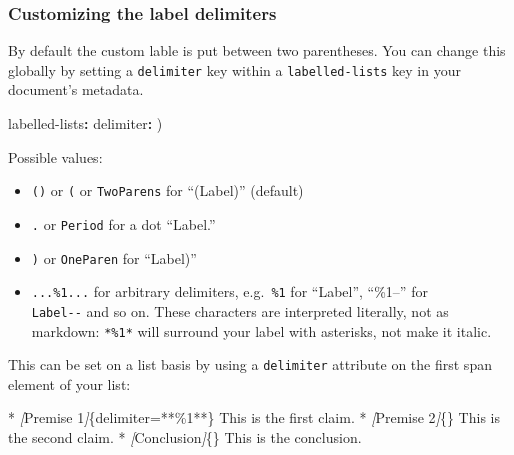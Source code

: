 \documentclass[
]{article}
\newenvironment{Shaded}{}{}
\newcommand{\AttributeTok}[1]{\textcolor[rgb]{0.49,0.56,0.16}{#1}}
\newcommand{\CommentTok}[1]{\textcolor[rgb]{0.38,0.63,0.69}{\textit{#1}}}
\newcommand{\FunctionTok}[1]{\textcolor[rgb]{0.02,0.16,0.49}{#1}}
\newcommand{\KeywordTok}[1]{\textcolor[rgb]{0.00,0.44,0.13}{\textbf{#1}}}
\newcommand{\NormalTok}[1]{#1}
\newcommand{\OtherTok}[1]{\textcolor[rgb]{0.00,0.44,0.13}{#1}}
\newcommand{\SpecialStringTok}[1]{\textcolor[rgb]{0.73,0.40,0.53}{#1}}
\providecommand{\tightlist}{%
  \setlength{\itemsep}{0pt}\setlength{\parskip}{0pt}}
\begin{document}
\hypertarget{customizing-the-label-delimiters}{%
\subsubsection{Customizing the label
delimiters}\label{customizing-the-label-delimiters}}

By default the custom lable is put between two parentheses. You can
change this globally by setting a \texttt{delimiter} key within a
\texttt{labelled-lists} key in your document's metadata.

\begin{Shaded}
\begin{Highlighting}[]
\FunctionTok{labelled{-}lists}\KeywordTok{:}
\AttributeTok{  }\FunctionTok{delimiter}\KeywordTok{:}\AttributeTok{ )}
\end{Highlighting}
\end{Shaded}

Possible values:

\begin{itemize}
\tightlist
\item
  \texttt{()} or \texttt{(} or \texttt{TwoParens} for ``(Label)''
  (default)
\item
  \texttt{.} or \texttt{Period} for a dot ``Label.''
\item
  \texttt{)} or \texttt{OneParen} for ``Label)''
\item
  \texttt{...\%1...} for arbitrary delimiters,
  e.g.~\texttt{\textbar{}\%1\textbar{}} for
  ``\textbar Label\textbar{}'', ``\%1--'' for\\
  \texttt{Label-\/-} and so on. These characters are interpreted
  literally, not as markdown: \texttt{*\%1*} will surround your label
  with asterisks, not make it italic.
\end{itemize}

This can be set on a list basis by using a \texttt{delimiter} attribute
on the first span element of your list:

\begin{Shaded}
\begin{Highlighting}[]
\SpecialStringTok{* }\CommentTok{[}\OtherTok{Premise 1}\CommentTok{]}\NormalTok{\{delimiter=\textquotesingle{}**\%1**\textquotesingle{}\} This is the first claim.}
\SpecialStringTok{* }\CommentTok{[}\OtherTok{Premise 2}\CommentTok{]}\NormalTok{\{\} This is the second claim.}
\SpecialStringTok{* }\CommentTok{[}\OtherTok{Conclusion}\CommentTok{]}\NormalTok{\{\} This is the conclusion.}
\end{Highlighting}
\end{Shaded}
\end{document}
